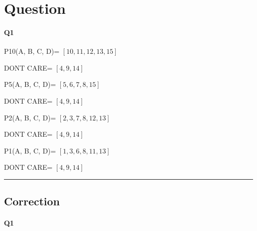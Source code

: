 
\section{Question}


\paragraph{Q1}


P10(A, B, C, D)= $[10, 11, 12, 13, 15]$

DONT CARE= $[4, 9, 14]$

P5(A, B, C, D)= $[5, 6, 7, 8, 15]$

DONT CARE= $[4, 9, 14]$

P2(A, B, C, D)= $[2, 3, 7, 8, 12, 13]$

DONT CARE= $[4, 9, 14]$

P1(A, B, C, D)= $[1, 3, 6, 8, 11, 13]$

DONT CARE= $[4, 9, 14]$



\hrule width 1\linewidth
\pagebreak

\subsection{Correction}


\paragraph{Q1}

